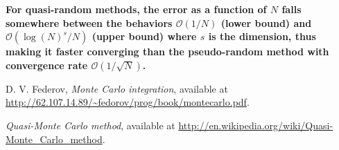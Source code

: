 \documentclass{article}
\begin{document}
\textbf{For quasi-random methods, the error as a function of $N$ falls somewhere between the
behaviors $\mathcal{O}(1/N)$ (lower bound) and $\mathcal{O}(\log(N)^s/N)$ (upper bound) where $s$ is the 
dimension, thus making it faster converging than the pseudo-random method with
convergence rate $\mathcal{O}(1/\sqrt{N})$.}


\newpage
\begin{thebibliography}{99}

 D. V. Federov, \emph{Monte Carlo integration},  available at
\url{http://62.107.14.89/~fedorov/prog/book/montecarlo.pdf}.

 \emph{Quasi-Monte Carlo method},  available at
\url{http://en.wikipedia.org/wiki/Quasi-Monte_Carlo_method}.

\end{thebibliography}
\end{document}
